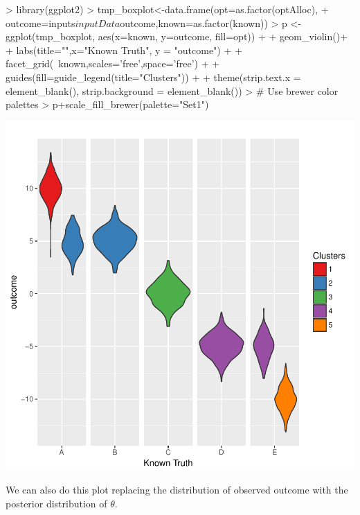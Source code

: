 \documentclass{article}
\begin{document}
\begin{Schunk}
\begin{Sinput}
> library(ggplot2)    
> tmp_boxplot<-data.frame(opt=as.factor(optAlloc),
+                         outcome=inputs$inputData$outcome,known=as.factor(known))
> p <- ggplot(tmp_boxplot, aes(x=known, y=outcome, fill=opt)) + 
+   geom_violin()+
+   labs(title="",x="Known Truth", y = "outcome") +
+   facet_grid(~known,scales='free',space='free') + 
+   guides(fill=guide_legend(title="Clusters")) +
+   theme(strip.text.x = element_blank(), strip.background = element_blank()) 
> # Use brewer color palettes
> p+scale_fill_brewer(palette="Set1")
\end{Sinput}
\end{Schunk}
\includegraphics{Fig-test2}

We can also do this plot replacing the distribution of observed outcome with the posterior distribution of $\theta$. 
\end{document}
